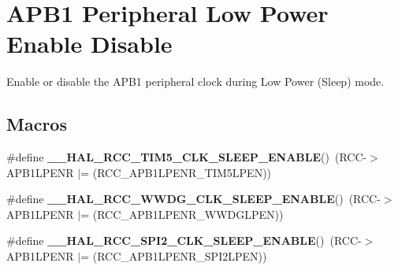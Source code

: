 \hypertarget{group___r_c_c___a_p_b1___low_power___enable___disable}{}\section{A\+P\+B1 Peripheral Low Power Enable Disable}
\label{group___r_c_c___a_p_b1___low_power___enable___disable}


Enable or disable the A\+P\+B1 peripheral clock during Low Power (Sleep) mode.  


\subsection*{Macros}
\begin{DoxyCompactItemize}
\item 
\mbox{\label{group___r_c_c___a_p_b1___low_power___enable___disable_gae99e46f9e40655dc9b5c07b03fdc4a4e}} 
\#define {\bfseries \+\_\+\+\_\+\+H\+A\+L\+\_\+\+R\+C\+C\+\_\+\+T\+I\+M5\+\_\+\+C\+L\+K\+\_\+\+S\+L\+E\+E\+P\+\_\+\+E\+N\+A\+B\+LE}()~(R\+CC-\/$>$A\+P\+B1\+L\+P\+E\+NR $\vert$= (R\+C\+C\+\_\+\+A\+P\+B1\+L\+P\+E\+N\+R\+\_\+\+T\+I\+M5\+L\+P\+EN))
\item 
\mbox{\label{group___r_c_c___a_p_b1___low_power___enable___disable_gaa3978a2e193b921dc24976880dce7a26}} 
\#define {\bfseries \+\_\+\+\_\+\+H\+A\+L\+\_\+\+R\+C\+C\+\_\+\+W\+W\+D\+G\+\_\+\+C\+L\+K\+\_\+\+S\+L\+E\+E\+P\+\_\+\+E\+N\+A\+B\+LE}()~(R\+CC-\/$>$A\+P\+B1\+L\+P\+E\+NR $\vert$= (R\+C\+C\+\_\+\+A\+P\+B1\+L\+P\+E\+N\+R\+\_\+\+W\+W\+D\+G\+L\+P\+EN))
\item 
\mbox{\label{group___r_c_c___a_p_b1___low_power___enable___disable_ga8a281ca72aff1c9fa87755c3854cc316}} 
\#define {\bfseries \+\_\+\+\_\+\+H\+A\+L\+\_\+\+R\+C\+C\+\_\+\+S\+P\+I2\+\_\+\+C\+L\+K\+\_\+\+S\+L\+E\+E\+P\+\_\+\+E\+N\+A\+B\+LE}()~(R\+CC-\/$>$A\+P\+B1\+L\+P\+E\+NR $\vert$= (R\+C\+C\+\_\+\+A\+P\+B1\+L\+P\+E\+N\+R\+\_\+\+S\+P\+I2\+L\+P\+EN))
\item 
\mbox{\label{group___r_c_c___a_p_b1___low_power___enable___disable_ga12132da4a7f5c62f32cd9d91b1c99495}} 

\end{DoxyCompactItemize}
